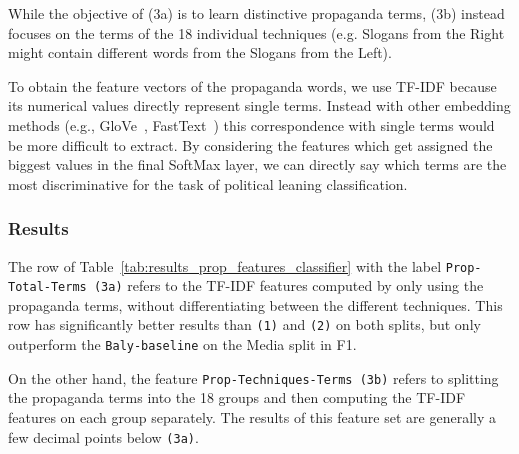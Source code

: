 While the objective of (3a) is to learn distinctive propaganda terms, (3b) instead focuses on the terms of the 18 individual techniques (e.g. Slogans from the Right might contain different words from the Slogans from the Left).

To obtain the feature vectors of the propaganda words, we use TF-IDF
because its numerical values directly represent single terms. Instead with other embedding methods (e.g., GloVe~\citep{pennington2014glove}, FastText~\citep{joulin2016fasttext}) this correspondence with single terms would be more difficult to extract. By considering the features which get assigned the biggest values in the final SoftMax layer, we can directly say which terms are the most discriminative for the task of political leaning classification.

\subsubsection{Results}

The row of Table~\ref{tab:results_prop_features_classifier} with the label \texttt{Prop-Total-Terms (3a)} refers to the TF-IDF features computed by only using the propaganda terms, without differentiating between the different techniques.
This row has significantly better results than \texttt{(1)} and \texttt{(2)} on both splits, but only outperform the \texttt{Baly-baseline}  on the Media split in F1. %

On the other hand, the feature \texttt{Prop-Techniques-Terms (3b)} refers to splitting the propaganda terms into the 18 groups and then computing the TF-IDF features on each group separately. The results of this feature set are generally a few decimal points below \texttt{(3a)}.



